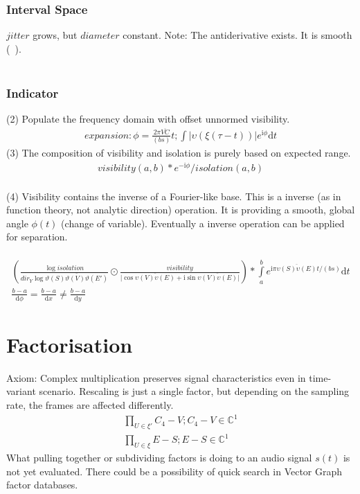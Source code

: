 \documentclass{report}
\begin{document}
\subsection*{Interval Space}
$jitter$ grows, but $diameter$ constant.
Note: The antiderivative exists. It is smooth (~\cite[Riemann Integrable]{Widon}).\\\\

\subsection{Indicator}
(2) Populate the frequency domain with offset unnormed visibility.
\begin{align}
expansion: \phi = \frac{2\pi\overline{VC}}{(bs)}t; \int \lvert \upsilon (\xi (\tau - t))\rvert e^{\mathrm{i}\phi}\mathrm{d}t
\end{align}
(3) The composition of visibility and isolation is purely based on expected range.
\begin{align}
visibility(a,b)*e^{-\mathrm{i}\phi}/isolation(a,b)
\end{align}\\
(4) Visibility contains the inverse of a Fourier-like base. This is a inverse (as in function theory, not analytic direction) operation. It is providing a smooth, global angle $\phi(t)$ (change of variable). Eventually a inverse operation can be applied for separation.\\\\
\begin{align}
(\frac{\log isolation}{dir_{Y}\log\overline{\vartheta (S)\vartheta (V)\vartheta (E')}} \odot \frac{visibility}{\lvert \cos\overline{\upsilon (V)\upsilon (E)}+\mathrm{i}\sin\overline{\upsilon (V)\upsilon (E)}\rvert})*\int \limits _{a}^{b} e^{\mathrm{i}\pi\overline{\upsilon (S)\upsilon (E)}t/(bs)}\mathrm{d}t\\
\frac{b-a}{\mathrm{d}\phi}=\frac{b-a}{\mathrm{d}x}\not =\frac{b-a}{\mathrm{d}y}
\end{align}

\chapter{Factorisation}
Axiom: Complex multiplication preserves signal characteristics even in time-variant scenario. Rescaling is just a single factor, but depending on the sampling rate, the frames are affected differently.
\begin{align}
\prod \limits _{U \in \xi'} C_{4}-V;C_{4}-V \in \mathbb{C}^1\\
\prod \limits _{U \in \xi} E-S;E-S \in \mathbb{C}^1
\end{align}
What pulling together or subdividing factors is doing to an audio signal $s(t)$ is not yet evaluated. There could be a possibility of quick search in Vector Graph factor databases.
\end{document}

